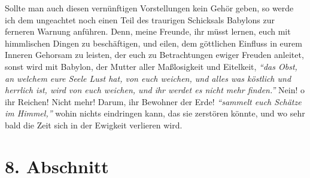 \medskip

Sollte man auch diesen vernünftigen Vorstellungen kein Gehör geben, so werde ich
dem ungeachtet noch einen Teil des traurigen Schicksals Babylons zur ferneren
Warnung anführen. Denn, meine Freunde, ihr müsst lernen, euch mit himmlischen
Dingen zu beschäftigen, und eilen, dem göttlichen Einfluss in eurem Inneren
Gehorsam zu leisten, der euch zu Betrachtungen ewiger Freuden anleitet, sonst
wird mit Babylon, der Mutter aller
Maßlosigkeit und
Eitelkeit,
\textit{"`das Obst, an
welchem eure Seele Lust hat, von euch weichen, und alles was köstlich und
herrlich ist, wird von euch weichen, und ihr werdet es nicht mehr
finden."'}
Nein! o ihr Reichen! Nicht mehr! Darum, ihr
Bewohner der Erde!
\textit{"`sammelt euch Schätze im Himmel,"'}
wohin nichts eindringen kann, das sie zerstören könnte, und wo sehr bald die
Zeit sich in der Ewigkeit verlieren wird.

\section{8. Abschnitt} \label{kap18_ab8}

